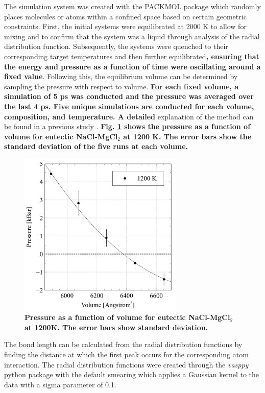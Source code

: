\documentclass[review]{elsarticle}
\providecommand{\DIFaddtex}[1]{{\bf #1}} %
\providecommand{\DIFdeltex}[1]{} %
\providecommand{\DIFaddbegin}{\protect\color{blue}} %
\providecommand{\DIFaddend}{\protect\color{black}} %
\providecommand{\DIFdelbegin}{\protect\color{red}} %
\providecommand{\DIFdelend}{\protect\color{black}} %
\providecommand{\DIFaddFL}[1]{\DIFadd{#1}} %
\providecommand{\DIFadd}[1]{\texorpdfstring{\DIFaddtex{#1}}{#1}} %
\providecommand{\DIFdel}[1]{\texorpdfstring{\DIFdeltex{#1}}{}} %
\newcommand{\DIFscaledelfig}{0.5}
\newlength{\DIFdelgraphicswidth} %
\newlength{\DIFdelgraphicsheight} %
\newcommand{\DIFaddincludegraphics}[2][]{{\color{blue}\fbox{\DIFOincludegraphics[#1]{#2}}}} %
\newcommand{\DIFdelincludegraphics}[2][]{%
\sbox{\DIFdelgraphicsbox}{\DIFOincludegraphics[#1]{#2}}%
\settoboxwidth{\DIFdelgraphicswidth}{\DIFdelgraphicsbox} %
\settoboxtotalheight{\DIFdelgraphicsheight}{\DIFdelgraphicsbox} %
\scalebox{\DIFscaledelfig}{%
\parbox[b]{\DIFdelgraphicswidth}{\usebox{\DIFdelgraphicsbox}\\[-\baselineskip] \rule{\DIFdelgraphicswidth}{0em}}\llap{\resizebox{\DIFdelgraphicswidth}{\DIFdelgraphicsheight}{%
\setlength{\unitlength}{\DIFdelgraphicswidth}%
\begin{picture}(1,1)%
\thicklines\linethickness{2pt} %
{\color[rgb]{1,0,0}\put(0,0){\framebox(1,1){}}}%
{\color[rgb]{1,0,0}\put(0,0){\line( 1,1){1}}}%
{\color[rgb]{1,0,0}\put(0,1){\line(1,-1){1}}}%
\end{picture}%
}\hspace*{3pt}}} %
} %
\DeclareRobustCommand{\DIFaddbegin}{\DIFOaddbegin \let\includegraphics\DIFaddincludegraphics} %
\DeclareRobustCommand{\DIFaddend}{\DIFOaddend \let\includegraphics\DIFOincludegraphics} %
\DeclareRobustCommand{\DIFdelbegin}{\DIFOdelbegin \let\includegraphics\DIFdelincludegraphics} %
\DeclareRobustCommand{\DIFdelend}{\DIFOaddend \let\includegraphics\DIFOincludegraphics} %
\begin{document}
The simulation system was created with the PACKMOL package \cite{martinez2009} which randomly places molecules or atoms within a confined space based on certain geometric constraints. First, the initial systems were equilibrated at 2000 K to allow for mixing and to confirm that the system was a liquid through analysis of the radial distribution function. Subsequently, the systems were quenched to their corresponding target temperatures and then further equilibrated\DIFaddbegin \DIFadd{, ensuring that the energy and pressure as a function of time were oscillating around a fixed value}\DIFaddend . Following this, the equilibrium volume can be determined by sampling the pressure with respect to volume. \DIFdelbegin \DIFdel{Detailed }\DIFdelend \DIFaddbegin \DIFadd{For each fixed volume, a simulation of 5 ps was conducted and the pressure was averaged over the last 4 ps. Five unique simulations are conducted for each volume, composition, and temperature. A detailed }\DIFaddend explanation of the method can be found in a previous study \cite{Duemmler2021}. \DIFaddbegin \DIFadd{Fig. \ref{fig:PVV} shows the pressure as a function of volume for eutectic NaCl-MgCl$_2$ at 1200 K. The error bars show the standard deviation of the five runs at each volume.
}\DIFaddend 

\DIFaddbegin \begin{figure}[h]
 \centering
 \includegraphics[width=0.7\textwidth]{images/PressureVsVolume.jpg} 
 \caption{\DIFaddFL{Pressure as a function of volume for eutectic NaCl-MgCl$_2$ at 1200K. The error bars show standard deviation.}}
 \label{fig:PVV}
\end{figure} 

\DIFaddend The bond length can be calculated from the radial distribution functions by finding the distance at which the first peak occurs for the corresponding atom interaction. The radial distribution functions were created through the \textit{vasppy} python package with the default smearing which applies a Gaussian kernel to the data with a sigma parameter of 0.1. 
\DIFaddbegin 
\end{document}
